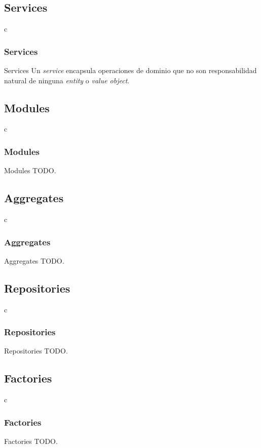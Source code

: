 \documentclass[a4paper,slidestop,xcolor=pst,dvips,blue]{beamer}
\begin{document}
\subsection{Services}

\begin{frame}{c}
    \frametitle{Services}
    \begin{block}{Services}
        Un \emph{service} encapsula operaciones de dominio que no son responsabilidad natural de ninguna \emph{entity} o \emph{value object}.
    \end{block}
\end{frame}

\subsection{Modules}

\begin{frame}{c}
    \frametitle{Modules}
    \begin{block}{Modules}
    TODO.
    \end{block}
\end{frame}

\subsection{Aggregates}

\begin{frame}{c}
    \frametitle{Aggregates}
    \begin{block}{Aggregates}
    TODO.
    \end{block}
\end{frame}

\subsection{Repositories}

\begin{frame}{c}
    \frametitle{Repositories}
    \begin{block}{Repositories}
    TODO.
    \end{block}
\end{frame}

\subsection{Factories}

\begin{frame}{c}
    \frametitle{Factories}
    \begin{block}{Factories}
    TODO.
    \end{block}
\end{frame}
\end{document}
